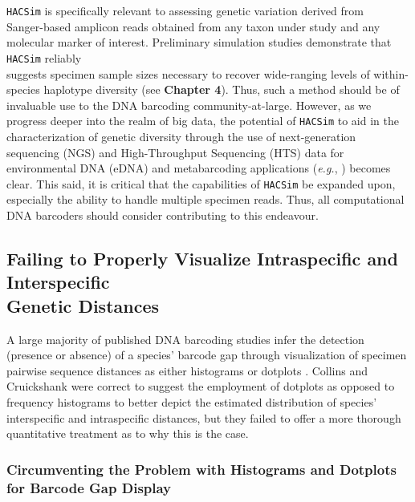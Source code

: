 {\tt HACSim} is specifically relevant to assessing genetic variation derived from \\ Sanger-based amplicon reads obtained from any taxon under study and any molecular marker of interest. Preliminary simulation studies demonstrate that {\tt HACSim} reliably \\ suggests specimen sample sizes necessary to recover wide-ranging levels of within-species haplotype diversity (see \textbf {Chapter 4}). Thus, such a method should be of invaluable use to the DNA barcoding community-at-large. However, as we progress deeper into the realm of big data, the potential of {\tt HACSim} to aid in the characterization of genetic diversity through the use of next-generation sequencing (NGS) and High-Throughput Sequencing (HTS) data for environmental DNA (eDNA) and metabarcoding applications (\textit{e.g.}, \cite{deiner2017long, elbrecht2018estimating}) becomes clear. This said, it is critical that the capabilities of {\tt HACSim} be expanded upon, especially the ability to handle multiple specimen reads. Thus, all computational DNA barcoders should consider contributing to this endeavour.



\subsection{Failing to Properly Visualize Intraspecific and Interspecific \\ Genetic Distances}

A large majority of published DNA barcoding studies infer the detection (presence or absence) of a species' barcode gap through visualization of specimen pairwise sequence distances as either histograms or dotplots \cite{collins2013seven}. Collins and Cruickshank \cite{collins2013seven} were correct to suggest the employment of dotplots as opposed to frequency histograms to better depict the estimated distribution of species' interspecific and intraspecific distances, but they failed to offer a more thorough quantitative treatment as to why this is the case. 



\subsubsection{Circumventing the Problem with Histograms and Dotplots for Barcode Gap Display}

